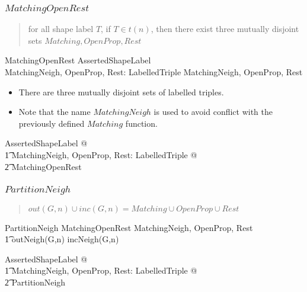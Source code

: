 \documentclass{article}
\begin{document}
\subsubsection{$MatchingOpenRest$}
\begin{quote}
for all shape label $T$, if $T \in t(n)$, then there exist three mutually disjoint sets $Matching, OpenProp, Rest$
\end{quote}
\begin{schema}{MatchingOpenRest}
	AssertedShapeLabel \\
	MatchingNeigh, OpenProp, Rest: \finset LabelledTriple
\where
	\disjoint \langle MatchingNeigh, OpenProp, Rest \rangle
\end{schema}
\begin{itemize}
\item There are three mutually disjoint sets of labelled triples.
\item Note that the name $MatchingNeigh$ is used to avoid conflict with the previously defined $Matching$ function.
\end{itemize}

\begin{zed}
	\forall AssertedShapeLabel @ \\
\t1		\exists MatchingNeigh, OpenProp, Rest: \finset LabelledTriple @ \\
\t2			MatchingOpenRest
\end{zed}

\subsubsection{$PartitionNeigh$}
\begin{quote}
$out(G, n) \cup inc(G, n) = Matching \cup OpenProp \cup Rest$
\end{quote}
\begin{schema}{PartitionNeigh}
	MatchingOpenRest
\where
	\langle MatchingNeigh, OpenProp, Rest \rangle \partition \\
\t1		outNeigh(G,n) \cup incNeigh(G,n)
\end{schema}

\begin{zed}
	\forall AssertedShapeLabel @ \\
\t1		\exists MatchingNeigh, OpenProp, Rest: \finset LabelledTriple @ \\
\t2			PartitionNeigh
\end{zed}
\end{document}
